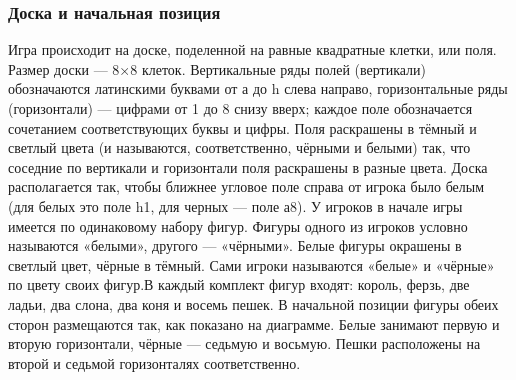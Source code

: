 \subsubsection*{Доска и начальная позиция}
 Игра происходит на доске, поделенной на равные квадратные клетки, или поля. Размер доски — 8×8 клеток. Вертикальные ряды полей (вертикали) обозначаются латинскими буквами от а до h слева направо, горизонтальные ряды (горизонтали) — цифрами от 1 до 8 снизу вверх; каждое поле обозначается сочетанием соответствующих буквы и цифры. Поля раскрашены в тёмный и светлый цвета (и называются, соответственно, чёрными и белыми) так, что соседние по вертикали и горизонтали поля раскрашены в разные цвета. Доска располагается так, чтобы ближнее угловое поле справа от игрока было белым (для белых это поле h1, для черных — поле а8). У игроков в начале игры имеется по одинаковому набору фигур. Фигуры одного из игроков условно называются «белыми», другого — «чёрными». Белые фигуры окрашены в светлый цвет, чёрные в тёмный. Сами игроки называются «белые» и «чёрные» по цвету своих фигур.В каждый комплект фигур входят: король, ферзь, две ладьи, два слона, два коня и восемь пешек. В начальной позиции фигуры обеих сторон размещаются так, как показано на диаграмме. Белые занимают первую и вторую горизонтали, чёрные — седьмую и восьмую. Пешки расположены на второй и седьмой горизонталях соответственно.\\

